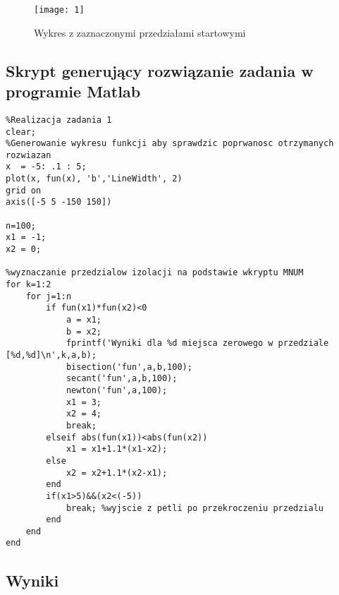 \documentclass[a4paper, 11pt]{article}
\begin{document}
\begin{figure}[H]
\caption{Wykres z zaznaczonymi przedziałami startowymi}
\texttt{[image: 1]}
\end{figure}


\subsection{Skrypt generujący rozwiązanie zadania w programie Matlab}
\begin{lstlisting}
%Realizacja zadania 1
clear; 
%Generowanie wykresu funkcji aby sprawdzic poprwanosc otrzymanych rozwiazan 
x  = -5: .1 : 5;
plot(x, fun(x), 'b','LineWidth', 2)
grid on
axis([-5 5 -150 150])

n=100; 
x1 = -1; 
x2 = 0; 

%wyznaczanie przedzialow izolacji na podstawie wkryptu MNUM
for k=1:2
    for j=1:n
        if fun(x1)*fun(x2)<0
            a = x1;
            b = x2;
            fprintf('Wyniki dla %d miejsca zerowego w przedziale [%d,%d]\n',k,a,b);
            bisection('fun',a,b,100);
            secant('fun',a,b,100);
            newton('fun',a,100);
            x1 = 3; 
            x2 = 4; 
            break;
        elseif abs(fun(x1))<abs(fun(x2))
            x1 = x1+1.1*(x1-x2);
        else
            x2 = x2+1.1*(x2-x1);
        end
        if(x1>5)&&(x2<(-5))
            break; %wyjscie z petli po przekroczeniu przedzialu
        end
    end
end
\end{lstlisting}
\vspace{1cm}


\subsection{Wyniki}
\end{document}
